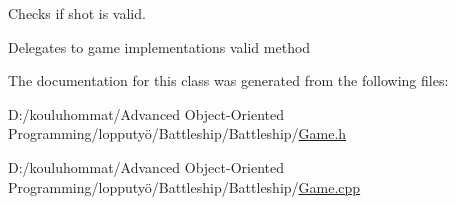 Checks if shot is valid. 

Delegates to game implementations valid method 

The documentation for this class was generated from the following files\+:\begin{DoxyCompactItemize}
\item 
D\+:/kouluhommat/\+Advanced Object-\/\+Oriented Programming/lopputyö/\+Battleship/\+Battleship/\mbox{\hyperlink{_game_8h}{Game.\+h}}\item 
D\+:/kouluhommat/\+Advanced Object-\/\+Oriented Programming/lopputyö/\+Battleship/\+Battleship/\mbox{\hyperlink{_game_8cpp}{Game.\+cpp}}\end{DoxyCompactItemize}
